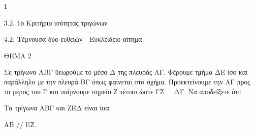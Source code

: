 \begin{ylh}{1}
    \item 3.2. 1ο Κριτήριο ισότητας τριγώνων
    \item 4.2. Τέμνουσα δύο ευθειών - Ευκλείδειο αίτημα.
\end{ylh}

ΘΕΜΑ 2

Σε τρίγωνο ΑΒΓ θεωρούμε το μέσο Δ της πλευράς ΑΓ. Φέρουμε τμήμα ΔΕ ίσο και παράλληλο με την πλευρά ΒΓ όπως φαίνεται στο σχήμα. Προεκτείνουμε την ΑΓ προς το μέρος του Γ και παίρνουμε σημείο Ζ τέτοιο ώστε ΓΖ = ΔΓ. Να αποδείξετε ότι:

\begin{alist}
\item Τα τρίγωνα ΑΒΓ και ΖΕΔ είναι ίσα. 

\item ΑΒ // ΕΖ. 


\begin{center}
\end{center}
\end{alist}
